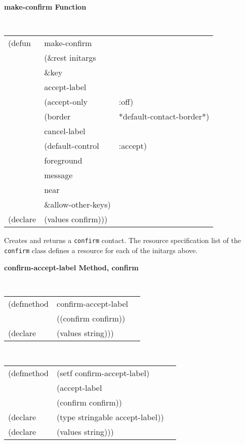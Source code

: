 {\samepage
{\large {\bf make-confirm \hfill Function}} 
\begin{flushright} \parbox[t]{6.125in}{
\tt
\begin{tabular}{lll}
\raggedright
(defun & make-confirm \\
       & (\&rest initargs \\
       & \&key  \\ 
       & accept-label         &  \\ 
       & (accept-only         & :off) \\ 
       & (border                & *default-contact-border*) \\ 
       & cancel-label         &  \\ 
       & (default-control & :accept)\\
       & foreground \\
       & message               & \\
       & near                   & \\
       & \&allow-other-keys) \\
(declare & (values   confirm)))
\end{tabular}
\rm

}\end{flushright}}

\begin{flushright} \parbox[t]{6.125in}{
Creates and returns a {\tt confirm} contact.
The resource specification list of the {\tt confirm} class defines
a resource for each of the initargs above.

}\end{flushright}

{\samepage
{\large {\bf confirm-accept-label \hfill Method, confirm}}
\begin{flushright} \parbox[t]{6.125in}{
\tt
\begin{tabular}{lll}
\raggedright
(defmethod & confirm-accept-label & \\
           & ((confirm  confirm)) \\
(declare & (values string)))
\end{tabular}
\rm

}\end{flushright}}

{\samepage
\begin{flushright} \parbox[t]{6.125in}{
\tt
\begin{tabular}{lll}
\raggedright
(defmethod & (setf confirm-accept-label) & \\
         & (accept-label \\
         & (confirm confirm)) \\
(declare &(type stringable  accept-label))\\
(declare & (values string)))
\end{tabular}
\rm
}
\end{flushright}}

